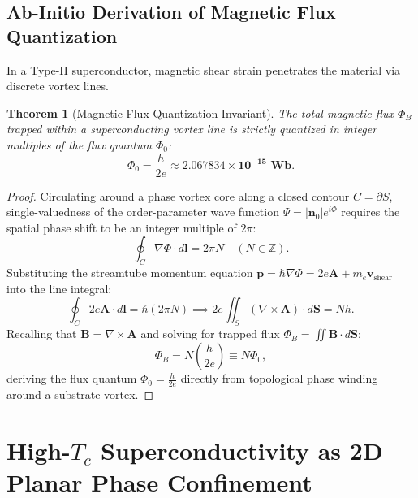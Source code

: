 \documentclass[11pt,a4paper]{article}
\newtheorem{thm}{Theorem}
\begin{document}
	\subsection{Ab-Initio Derivation of Magnetic Flux Quantization}
	In a Type-II superconductor, magnetic shear strain penetrates the material via discrete vortex lines.
	
	\begin{thm}[Magnetic Flux Quantization Invariant]
		\label{thm:flux_quantization}
		The total magnetic flux $\Phi_B$ trapped within a superconducting vortex line is strictly quantized in integer multiples of the flux quantum $\Phi_0$:
		\begin{equation}
			\Phi_0 = \frac{h}{2e} \approx \mathbf{2.067834 \times 10^{-15} \text{ Wb}}.
			\label{eq:flux_quantum_formula}
		\end{equation}
	\end{thm}
	
	\begin{proof}
		Circulating around a phase vortex core along a closed contour $C = \partial S$, single-valuedness of the order-parameter wave function $\Psi = |\mathbf{n}_0| e^{i\Phi}$ requires the spatial phase shift to be an integer multiple of $2\pi$:
		\begin{equation}
			\oint_C \nabla \Phi \cdot d\mathbf{l} = 2\pi N \quad (N \in \mathbb{Z}).
		\end{equation}
		Substituting the streamtube momentum equation $\mathbf{p} = \hbar \nabla \Phi = 2e \mathbf{A} + m_e \mathbf{v}_{\text{shear}}$ into the line integral:
		\begin{equation}
			\oint_C 2e \mathbf{A} \cdot d\mathbf{l} = \hbar (2\pi N) \implies 2e \iint_S (\nabla \times \mathbf{A}) \cdot d\mathbf{S} = N h.
		\end{equation}
		Recalling that $\mathbf{B} = \nabla \times \mathbf{A}$ and solving for trapped flux $\Phi_B = \iint \mathbf{B} \cdot d\mathbf{S}$:
		\begin{equation}
			\Phi_B = N \left( \frac{h}{2e} \right) \equiv N \Phi_0,
		\end{equation}
		deriving the flux quantum $\Phi_0 = \frac{h}{2e}$ directly from topological phase winding around a substrate vortex.
	\end{proof}
	
	\section{High-\texorpdfstring{$T_c$}{Tc} Superconductivity as 2D Planar Phase Confinement}
	\label{sec:high_tc_cuprates}
	
\end{document}
